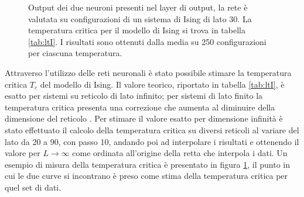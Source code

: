 \documentclass{article}
\begin{document}
\begin{figure}[ht]
\centering
{}
\caption{Output dei due neuroni presenti nel layer di output, la rete è valutata su configurazioni di un sistema di Ising di lato 30. La temperatura critica per il modello di Ising si trova in tabella \ref{tab:ltI}. I risultati sono ottenuti dalla media su 250 configurazioni per ciascuna temperatura.}
\label{fig:temp_cross}
\end{figure}

Attraverso l'utilizzo delle reti neuronali è stato possibile stimare la temperatura critica $T_c$ del modello di Ising.
Il valore teorico, riportato in tabella \ref{tab:ltI}, è esatto per sistemi su reticolo di lato infinito; per sistemi di lato finito la temperatura critica presenta una correzione che aumenta al diminuire della dimensione del reticolo \cite{fisher}.
Per stimare il valore esatto per dimensione infinità è stato effettuato il calcolo della temperatura critica su diversi reticoli al variare del lato da 20 a 90, con passo 10, andando poi ad interpolare i risultati e ottenendo il valore per $L\rightarrow \infty$ come ordinata all'origine della retta che interpola i dati.
Un esempio di misura della temperatura critica è presentato in figura \ref{fig:temp_cross}, il punto in cui le due curve si incontrano è preso come stima della temperatura critica per quel set di dati.
\end{document}
